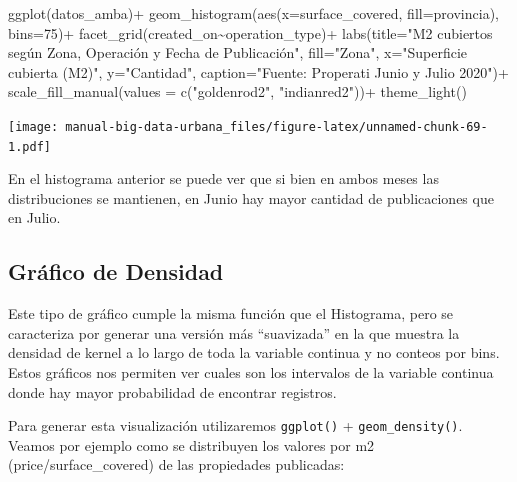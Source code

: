 \documentclass[
  spanish,
]{book}
\newenvironment{Shaded}{\begin{snugshade}}{\end{snugshade}}
\newcommand{\AttributeTok}[1]{\textcolor[rgb]{0.77,0.63,0.00}{#1}}
\newcommand{\DecValTok}[1]{\textcolor[rgb]{0.00,0.00,0.81}{#1}}
\newcommand{\FunctionTok}[1]{\textcolor[rgb]{0.00,0.00,0.00}{#1}}
\newcommand{\NormalTok}[1]{#1}
\newcommand{\SpecialCharTok}[1]{\textcolor[rgb]{0.00,0.00,0.00}{#1}}
\newcommand{\StringTok}[1]{\textcolor[rgb]{0.31,0.60,0.02}{#1}}
\begin{document}
\begin{Shaded}
\begin{Highlighting}[]
\FunctionTok{ggplot}\NormalTok{(datos\_amba)}\SpecialCharTok{+}
  \FunctionTok{geom\_histogram}\NormalTok{(}\FunctionTok{aes}\NormalTok{(}\AttributeTok{x=}\NormalTok{surface\_covered, }\AttributeTok{fill=}\NormalTok{provincia), }\AttributeTok{bins=}\DecValTok{75}\NormalTok{)}\SpecialCharTok{+}
  \FunctionTok{facet\_grid}\NormalTok{(created\_on}\SpecialCharTok{\textasciitilde{}}\NormalTok{operation\_type)}\SpecialCharTok{+}
  \FunctionTok{labs}\NormalTok{(}\AttributeTok{title=}\StringTok{"M2 cubiertos según Zona, Operación y Fecha de Publicación"}\NormalTok{,}
       \AttributeTok{fill=}\StringTok{"Zona"}\NormalTok{,}
       \AttributeTok{x=}\StringTok{"Superficie cubierta (M2)"}\NormalTok{,}
       \AttributeTok{y=}\StringTok{"Cantidad"}\NormalTok{,}
       \AttributeTok{caption=}\StringTok{"Fuente: Properati Junio y Julio 2020"}\NormalTok{)}\SpecialCharTok{+}
  \FunctionTok{scale\_fill\_manual}\NormalTok{(}\AttributeTok{values =} \FunctionTok{c}\NormalTok{(}\StringTok{"goldenrod2"}\NormalTok{, }\StringTok{"indianred2"}\NormalTok{))}\SpecialCharTok{+}
  \FunctionTok{theme\_light}\NormalTok{()}
\end{Highlighting}
\end{Shaded}

\texttt{[image: manual-big-data-urbana\_files/figure-latex/unnamed-chunk-69-1.pdf]}

En el histograma anterior se puede ver que si bien en ambos meses las distribuciones se mantienen, en Junio hay mayor cantidad de publicaciones que en Julio.

\hypertarget{gruxe1fico-de-densidad}{%
\subsection{Gráfico de Densidad}\label{gruxe1fico-de-densidad}}

Este tipo de gráfico cumple la misma función que el Histograma, pero se caracteriza por generar una versión más ``suavizada'' en la que muestra la densidad de kernel a lo largo de toda la variable continua y no conteos por bins. Estos gráficos nos permiten ver cuales son los intervalos de la variable continua donde hay mayor probabilidad de encontrar registros.

Para generar esta visualización utilizaremos \texttt{ggplot()} + \texttt{geom\_density()}. Veamos por ejemplo como se distribuyen los valores por m2 (price/surface\_covered) de las propiedades publicadas:
\end{document}
